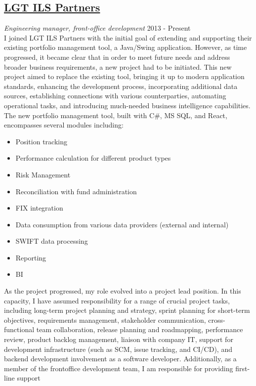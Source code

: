 \documentclass[margin, 10pt]{res}
\begin{document}
\begin{resume}
\section{\href{http://lgtcp.com}{LGT ILS Partners}}
{\sl Engineering manager, front-office development} \hfill 2013 - Present \\
I joined LGT ILS Partners with the initial goal of extending and supporting their existing portfolio management tool, a Java/Swing application. However, as time progressed, it became clear that in order to meet future needs and address broader business requirements, a new project had to be initiated. This new project aimed to replace the existing tool, bringing it up to modern application standards, enhancing the development process, incorporating additional data sources, establishing connections with various counterparties, automating operational tasks, and introducing much-needed business intelligence capabilities. The new portfolio management tool, built with C\#, MS SQL, and React, encompasses several modules including: 
\begin{itemize}
\item Position tracking  
\item Performance calculation for different product types 
\item Risk Management 
\item Reconciliation with fund administration
\item FIX integration
\item Data consumption from various data providers (external and internal)
\item SWIFT data processing 
\item Reporting
\item BI
\end{itemize} 

 As the project progressed, my role evolved into a project lead position. In this capacity, I have assumed responsibility for a range of crucial project tasks, including long-term project planning and strategy, sprint planning for short-term objectives, requirements management, stakeholder communication, cross-functional team collaboration, release planning and roadmapping, performance review, product backlog management, liaison with company IT, support for development infrastructure (such as SCM, issue tracking, and CI/CD), and backend development involvement as a software developer. Additionally, as a member of the frontoffice development team, I am responsible for providing first-line support


\end{resume}
\end{document}
